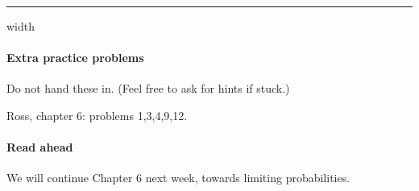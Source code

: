\documentclass{article}
\theoremstyle{definition}
\begin{document}

\hrule width \textwidth

\paragraph{Extra practice problems}
Do not hand these in. (Feel free to ask for hints if stuck.)

Ross, chapter 6: problems 1,3,4,9,12.

\paragraph{Read ahead}
We will continue Chapter 6 next week, towards limiting probabilities.
\end{document}
